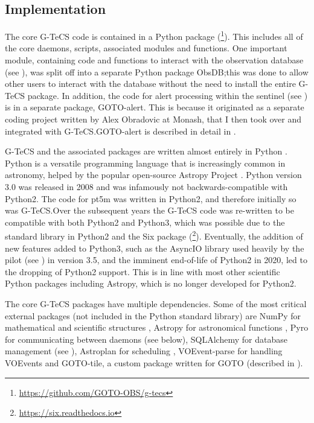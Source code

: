 
\subsection{Implementation}
\label{sec:implementation}
\begin{colsection}

The core G-TeCS code is contained in a Python package (\footnote{\url{https://github.com/GOTO-OBS/g-tecs}}). This includes all of the core daemons, scripts, associated modules and functions. One important module, containing code and functions to interact with the observation database (see ), was split off into a separate Python package ObsDB;\@ this was done to allow other users to interact with the database without the need to install the entire G-TeCS package. In addition, the code for alert processing within the sentinel (see ) is in a separate package, GOTO-alert. This is because it originated as a separate coding project written by Alex Obradovic at Monash, that I then took over and integrated with G-TeCS.\@ GOTO-alert is described in detail in .

G-TeCS and the associated packages are written almost entirely in Python \citep{Python}. Python is a versatile programming language that is increasingly common in astronomy, helped by the popular open-source Astropy Project \citep{astropy}. Python version 3.0 was released in 2008 and was infamously not backwards-compatible with Python2. The code for pt5m was written in Python2, and therefore initially so was G-TeCS.\@ Over the subsequent years the G-TeCS code was re-written to be compatible with both Python2 and Python3, which was possible due to the standard  library in Python2 and the Six package (\footnote{\url{https://six.readthedocs.io}}). Eventually, the addition of new features added to Python3, such as the AsyncIO library used heavily by the pilot (see ) in version 3.5, and the imminent end-of-life of Python2 in 2020, led to the dropping of Python2 support. This is in line with most other scientific Python packages including Astropy, which is no longer developed for Python2. %

The core G-TeCS packages have multiple dependencies. Some of the most critical external packages (not included in the Python standard library) are NumPy for mathematical and scientific structures \citep{NumPy}, Astropy for astronomical functions \citep{astropy}, Pyro for communicating between daemons (see  below), SQLAlchemy for database management (see ), Astroplan for scheduling \citep[][see ]{astroplan}, VOEvent-parse for handling VOEvents \citep[][see ]{voevent-parse} and GOTO-tile, a custom package written for GOTO (described in ).

\end{colsection}

